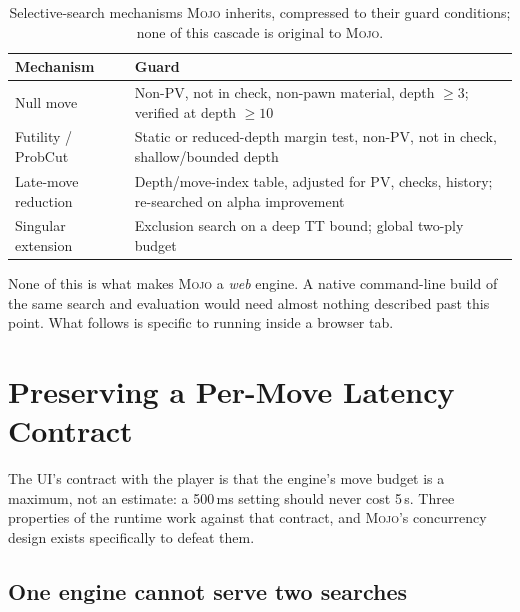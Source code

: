 \documentclass[10pt,twocolumn]{article}
\newcommand{\engine}{\textsc{Mojo}}
\begin{document}
\begin{table}[t]
\centering
\small
\caption{Selective-search mechanisms \engine{} inherits, compressed to their
guard conditions; none of this cascade is original to \engine{}.}
\label{tab:selectivity}
\begin{tabularx}{\columnwidth}{@{}p{}X@{}}
\toprule
Mechanism & Guard \\
\midrule
Null move & Non-PV, not in check, non-pawn material, depth $\geq3$; verified at depth $\geq10$ \citep{donninger1993null} \\
Futility / ProbCut & Static or reduced-depth margin test, non-PV, not in check, shallow/bounded depth \citep{heinz1998futility,buro1995probcut} \\
Late-move reduction & Depth/move-index table, adjusted for PV, checks, history; re-searched on alpha improvement \\
Singular extension & Exclusion search on a deep TT bound; global two-ply budget \citep{anantharaman1990singular} \\
\bottomrule
\end{tabularx}
\end{table}

None of this is what makes \engine{} a \emph{web} engine.  A native
command-line build of the same search and evaluation would need almost
nothing described past this point.  What follows is specific to running
inside a browser tab.

\section{Preserving a Per-Move Latency Contract}
\label{sec:latency}

The UI's contract with the player is that the engine's move budget is a
maximum, not an estimate: a 500\,ms setting should never cost 5\,s.  Three
properties of the runtime work against that contract, and \engine{}'s
concurrency design exists specifically to defeat them.

\subsection{One engine cannot serve two searches}
\end{document}
